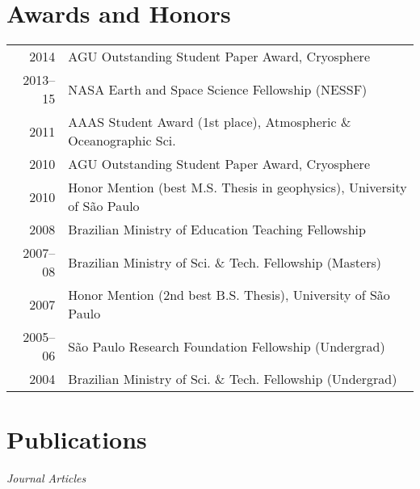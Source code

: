 \documentclass[a4paper,11pt]{article}
\begin{document}

\section{Awards and Honors}

\begin{tabular}{rl}
2014 & AGU Outstanding Student Paper Award, Cryosphere\\
2013--15 & NASA Earth and Space Science Fellowship (NESSF)\\
2011 & AAAS Student Award (1st place), Atmospheric \& Oceanographic Sci.\\
2010 & AGU Outstanding Student Paper Award, Cryosphere\\
2010 & Honor Mention (best M.S. Thesis in geophysics), University of S\~ao Paulo\\
2008 & Brazilian Ministry of Education Teaching Fellowship\\
2007--08 & Brazilian Ministry of Sci. \& Tech. Fellowship (Masters)\\
2007 & Honor Mention (2nd best B.S. Thesis), University of S\~ao Paulo\\
2005--06 & S\~ao Paulo Research Foundation Fellowship (Undergrad)\\
2004 & Brazilian Ministry of Sci. \& Tech. Fellowship (Undergrad)
\end{tabular}


\section{Publications}

\emph{Journal Articles}
\end{document}
